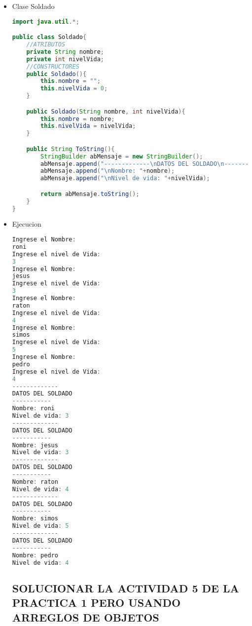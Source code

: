 \documentclass{article}
\begin{document}
\begin{itemize}
\begin{lstlisting}[language=java]
    private static void imprimirSoldados(){
        for(int con = 0; con < soldadito.length; con++){
            Soldado objSoldado1 = soldadito[con];
            System.out.println(objSoldado1.ToString());
        }
    }
    public static void main(String[] args){
        crearSoldados();
        imprimirSoldados();
    }
}
    \end{lstlisting}

    \item Clase Soldado
    \begin{lstlisting}[language=java]
import java.util.*;

public class Soldado{
    //ATRIBUTOS
    private String nombre;
    private int nivelVida;
    //CONSTRUCTORES
    public Soldado(){
        this.nombre = "";
        this.nivelVida = 0;
    }

    public Soldado(String nombre, int nivelVida){
        this.nombre = nombre;
        this.nivelVida = nivelVida;
    }

    public String ToString(){
        StringBuilder abMensaje = new StringBuilder();
        abMensaje.append("-------------\nDATOS DEL SOLDADO\n-----------");
        abMensaje.append("\nNombre: "+nombre);
        abMensaje.append("\nNivel de vida: "+nivelVida);

        return abMensaje.toString();
    }
}
    \end{lstlisting}
    
    \item Ejecucion
    \begin{lstlisting}[language=java]
Ingrese el Nombre:
roni
Ingrese el nivel de Vida:
3
Ingrese el Nombre:
jesus
Ingrese el nivel de Vida:
3
Ingrese el Nombre:
raton
Ingrese el nivel de Vida:
4
Ingrese el Nombre:
simos
Ingrese el nivel de Vida:
5
Ingrese el Nombre:
pedro
Ingrese el nivel de Vida:
4
-------------
DATOS DEL SOLDADO
-----------
Nombre: roni
Nivel de vida: 3
-------------
DATOS DEL SOLDADO
-----------
Nombre: jesus
Nivel de vida: 3
-------------
DATOS DEL SOLDADO
-----------
Nombre: raton
Nivel de vida: 4
-------------
DATOS DEL SOLDADO
-----------
Nombre: simos
Nivel de vida: 5
-------------
DATOS DEL SOLDADO
-----------
Nombre: pedro
Nivel de vida: 4
        \end{lstlisting}
    
    \subsection{SOLUCIONAR LA ACTIVIDAD 5 DE LA PRACTICA 1 PERO USANDO ARREGLOS DE OBJETOS}


\end{itemize}
\end{document}
